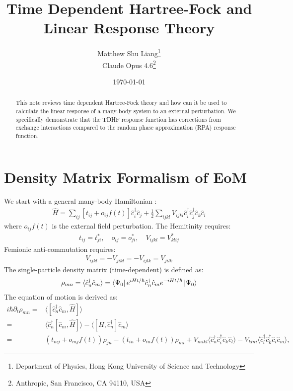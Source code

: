 \documentclass[11pt,letterpaper]{article}
\title{Time Dependent Hartree-Fock and Linear Response Theory}
\author{Matthew Shu Liang\thanks{Department of Physics, Hong Kong University of Science and Technology}\\ Claude Opus 4.6\thanks{Anthropic, San Francisco, CA 94110, USA}}
\date{\today}
\theoremstyle{definition}
\theoremstyle{plain}
\theoremstyle{remark}
\newcommand{\avg}[1]{\langle #1 \rangle}%
\begin{document}
\maketitle

\begin{abstract}
    This note reviews time dependent Hartree-Fock theory and how can it be used to calculate the linear response of a many-body system to an external perturbation. We specifically demonstrate that the TDHF response function has corrections from exchange interactions compared to the random phase approximation (RPA) response function.
\end{abstract}

\tableofcontents

\section{Density Matrix Formalism of EoM}
\label{subsec:density_matrix}
We start with a general many-body Hamiltonian \cite{shao2026}:
\begin{gather}
    \hat{H} = \sum_{ij}[t_{ij} + o_{ij} f(t)] \hat{c}^\dagger_i \hat{c}_j + \frac{1}{2} \sum_{ijkl} V_{ijkl} \hat{c}^\dagger_i \hat{c}^\dagger_j \hat{c}_k \hat{c}_l \label{eq:SB_Hamiltonian}
\end{gather}
where $o_{ij} f(t)$ is the external field perturbation. The Hemitinity requires:
\begin{gather}
    t_{ij} = t_{ji}^*, \quad o_{ij} = o_{ji}^*, \quad V_{ijkl} = V_{klij}^*
\end{gather}
Femionic anti-commutation requires:
\begin{gather}
    V_{ijkl} = -V_{jikl} = -V_{ijlk} = V_{jilk}
\end{gather}
The single-particle density matrix (time-dependent) is defined as:
\begin{gather}
    \rho_{mn} = \avg{\hat{c}^\dagger_n \hat{c}_m} = \bra{\Psi_0} e^{i H t/\hbar} \hat{c}^\dagger_n \hat{c}_m e^{-i H t/\hbar} \ket{\Psi_0} \label{def:density_matrix}
\end{gather}
The equation of motion is derived as:
\begin{align}
    i \hbar \partial_t \rho_{mn} =& \avg{[\hat{c}^\dagger_n \hat{c}_m, \hat{H}]} \\
    =& \avg{\hat{c}^\dagger_n[\hat{c}_m, \hat{H}]} - \avg{[\hat{H}, \hat{c}^\dagger_n] \hat{c}_m} \\
    =& (t_{mj} + o_{mj} f(t)) \rho_{jn} - (t_{in} + o_{in} f(t)) \rho_{mi} + V_{mikl} \avg{\hat{c}^\dagger_n \hat{c}^\dagger_i \hat{c}_k \hat{c}_l} - V_{klni} \avg{\hat{c}^\dagger_l \hat{c}^\dagger_k \hat{c}_i \hat{c}_m}, \label{eq:EoM_density_matrix}
\end{align}
\end{document}
